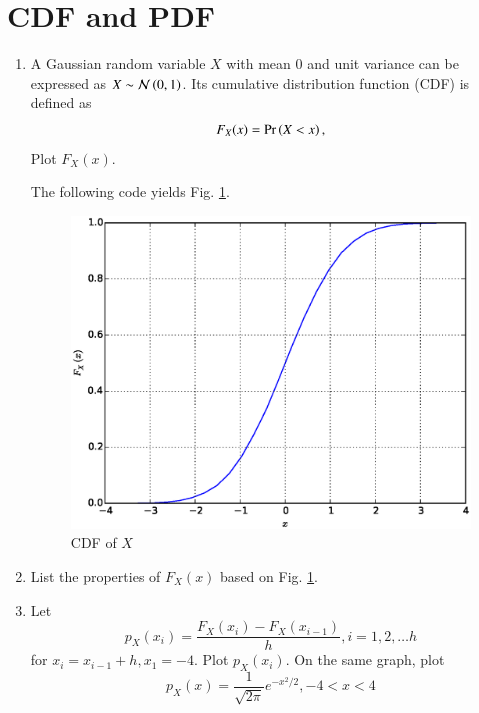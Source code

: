 \documentclass[journal,12pt,twocolumn]{IEEEtran}
\renewcommand\thesection{\arabic{section}}
\begin{document}
\section{CDF and PDF}
\begin{enumerate}[label=\thesection.\arabic*
,ref=\thesection.\theenumi]

\item
A Gaussian random variable $X$ with mean 0 and unit variance can be expressed as $X \sim \mathcal{N}\left(0,1\right)$. Its cumulative distribution function (CDF) is defined as
\begin{equation}
F_X(x) = \Pr\left(X < x\right), 
\end{equation}
Plot $F_X(x)$.

\solution  The following code yields Fig. \ref{ch1_prob3_fig}.

%
\begin{figure}
\centering
\includegraphics[width=\columnwidth]{./figs/ch1_prob3_fig}
\caption{CDF of $X$}
\label{ch1_prob3_fig}
\end{figure}
%
\item
List the properties of $F_X(x)$ based on Fig. \ref{ch1_prob3_fig}.

%
\item
Let
%
\begin{equation}
p_{X}(x_i) = \frac{F_{X}(x_i)-F_{X}(x_{i-1})}{h}, i = 1, 2, \dots
{h}
\end{equation}
%
for $x_i = x_{i-1}+h, x_1 = -4$. Plot $p_X(x_i)$.  On the same graph, plot
%
\begin{equation}
p_{X}(x) = \frac{1}{\sqrt{2\pi}}e^{-x^2/2}, - 4 < x < 4
\end{equation}
%


\end{enumerate}
\end{document}
